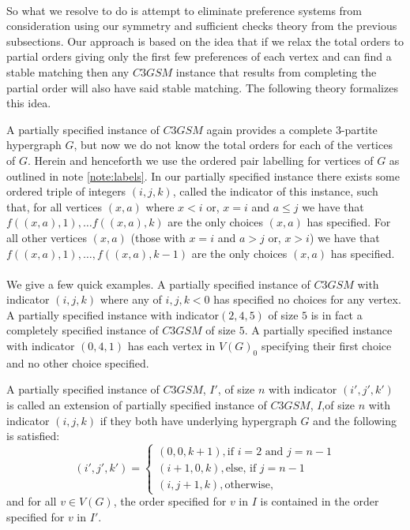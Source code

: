 \begin{definition}
\paragraph{}
So what we resolve to do is attempt to eliminate preference systems from consideration using our symmetry and sufficient checks theory from the previous subsections. Our approach is based on the idea that if we relax the total orders to partial orders giving only the first few preferences of each vertex and can find a stable matching then any $C3GSM$ instance that results from completing the partial order will also have said stable matching. The following theory formalizes this idea.
\begin{definition}
A partially specified instance of $C3GSM$ again provides a complete $3$-partite hypergraph $G$, but now we do not know the total orders for each of the vertices of $G$. Herein and henceforth we use the ordered pair labelling for vertices of $G$ as outlined in note \ref{note:labels}. In our partially specified instance there exists some ordered triple of integers $(i,j,k)$, called the indicator of this instance, such that, for all vertices $(x,a)$ where $x<i$ or, $x=i$ and $a\leq j$ we have that $f((x,a), 1), \dots f((x,a), k)$ are the only choices $(x,a)$ has specified. For all other vertices $(x,a)$ (those with $x=i$ and $a > j$ or, $x>i$) we have that $f((x,a), 1), \dots, f((x,a),k-1)$ are the only choices $(x,a)$ has specified.
\end{definition}
\paragraph{}
We give a few quick examples. A partially specified instance of $C3GSM$ with indicator $(i,j,k)$ where any of $i,j,k <0$ has specified no choices for any vertex. A partially specified instance with indicator$(2,4,5)$ of size $5$ is in fact a completely specified instance of $C3GSM$ of size $5$. A partially specified instance with indicator $(0,4,1)$ has each vertex in $V(G)_0$ specifying their first choice and no other choice specified.
\begin{definition}
A partially specified instance of $C3GSM$, $I'$, of size $n$ with indicator $(i',j',k')$ is called an extension of partially specified instance of $C3GSM$, $I$,of size $n$ with indicator $(i,j,k)$ if  they both have underlying hypergraph $G$ and the following is satisfied:
\begin{equation} \label{cond:indicator}
(i',j',k') = \begin{cases}
(0,0,k+1), \text{if $i=2$ and $j=n-1$} \\
(i+1, 0, k), \text{else, if $j = n-1$} \\
(i,j+1, k), \text{otherwise},
\end{cases}
\end{equation}
and for all $v \in V(G)$, the order specified for $v$  in $I$ is contained in the order specified for $v$ in $I'$.
\end{definition}

\end{definition}
